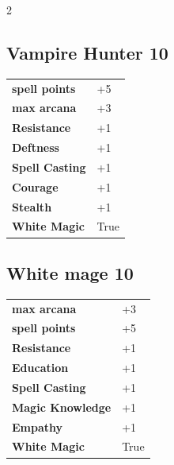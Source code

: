 \begin{multicols}{2}
\begin{tcolorbox}

\end{tcolorbox}

\begin{tcolorbox}
    \subsection*{Vampire Hunter \hfill \small{10 }}
    \tcblower




\begin{tabular}{@{}ll@{}}
    \textbf{spell points} & +5\\
    \textbf{max arcana} & +3\\
    \textbf{Resistance} & +1\\
    \textbf{Deftness} & +1\\
    \textbf{Spell Casting} & +1\\
    \textbf{Courage} & +1\\
    \textbf{Stealth} & +1\\
    \textbf{White Magic} & True\\
\end{tabular}


\end{tcolorbox}

\begin{tcolorbox}
    \subsection*{White mage \hfill \small{10 }}
    \tcblower




\begin{tabular}{@{}ll@{}}
    \textbf{max arcana} & +3\\
    \textbf{spell points} & +5\\
    \textbf{Resistance} & +1\\
    \textbf{Education} & +1\\
    \textbf{Spell Casting} & +1\\
    \textbf{Magic Knowledge} & +1\\
    \textbf{Empathy} & +1\\
    \textbf{White Magic} & True\\
\end{tabular}


\end{tcolorbox}
\end{multicols}
